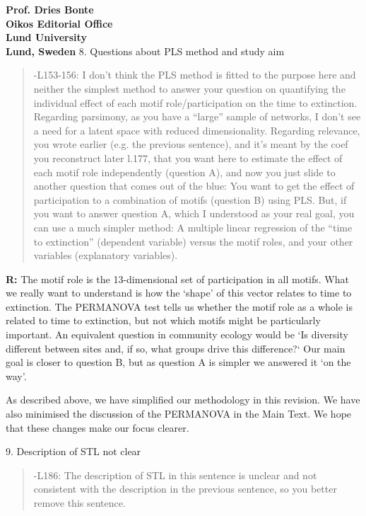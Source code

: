 \documentclass[12pt]{letter}
\begin{document}
\begin{letter}{\bf Prof. Dries Bonte\\
Oikos Editorial Office \\
Lund University \\
Lund, Sweden}
    8. Questions about PLS method and study aim 

        \begin{quotation}
        -L153-156:  I don’t think the PLS method is fitted to the purpose here and neither the simplest method to answer your question on quantifying the individual effect of each motif role/participation on the time to extinction. Regarding parsimony, as you have a ``large'' sample of networks, I don’t see a need for a latent space with reduced dimensionality. Regarding relevance, you wrote earlier (e.g. the previous sentence), and it’s meant by the coef you reconstruct later l.177, that you want here to estimate the effect of each motif role independently (question A), and now you just slide to another question that comes out of the blue: You want to get the effect of participation to a combination of motifs (question B) using PLS. But, if you want to answer question A, which I understood as your real goal, you can use a much simpler method: A multiple linear regression of the ``time to extinction'' (dependent variable) versus the motif roles, and your other variables (explanatory variables).
        \end{quotation}
        
        \textbf{R:}
        The motif role is the 13-dimensional set of participation in all motifs. What we really want to understand is how the `shape' of this vector relates to time to extinction. 
        The PERMANOVA test tells us whether the motif role as a whole is related to time to extinction, but not which motifs might be particularly important. 
        An equivalent question in community ecology would be `Is diversity different between sites and, if so, what groups drive this difference?` 
        Our main goal is closer to question B, but as question A is simpler we answered it `on the way'.


        As described above, we have simplified our methodology in this revision.
        We have also minimised the discussion of the PERMANOVA in the Main Text.
        We hope that these changes make our focus clearer.
    

    9. Description of STL not clear

    \begin{quotation}
      -L186: The description of STL in this sentence is unclear and not consistent with the description in the previous sentence, so you better remove this sentence.
    \end{quotation}


\end{letter}
\end{document}
